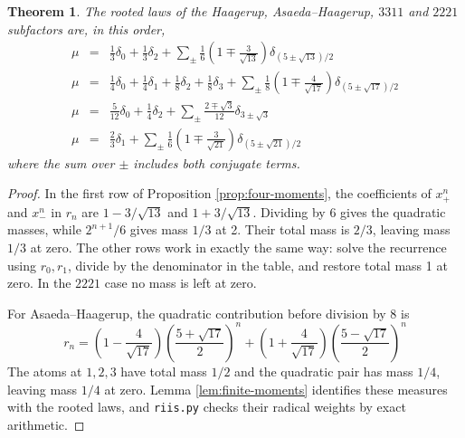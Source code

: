 \documentclass[11pt,reqno]{amsart}
\newtheorem{thm}{Theorem}[section]
\theoremstyle{definition}
\numberwithin{equation}{section}
\begin{document}
\begin{thm}\label{thm:four-laws}
The rooted laws of the Haagerup, Asaeda--Haagerup, $3311$ and $2221$ subfactors are, in this order,
\begin{eqnarray*}
\mu&=&\frac13\delta_0+\frac13\delta_2+\sum_\pm\frac16\left(1\mp\frac3{\sqrt{13}}\right)\delta_{(5\pm\sqrt{13})/2}\\
\mu&=&\frac14\delta_0+\frac14\delta_1+\frac18\delta_2+\frac18\delta_3+\sum_\pm\frac18\left(1\mp\frac4{\sqrt{17}}\right)\delta_{(5\pm\sqrt{17})/2}\\
\mu&=&\frac5{12}\delta_0+\frac14\delta_2+\sum_\pm\frac{2\mp\sqrt3}{12}\delta_{3\pm\sqrt3}\\
\mu&=&\frac23\delta_1+\sum_\pm\frac16\left(1\mp\frac3{\sqrt{21}}\right)\delta_{(5\pm\sqrt{21})/2}
\end{eqnarray*}
where the sum over $\pm$ includes both conjugate terms.
\end{thm}
\begin{proof}
In the first row of Proposition \ref{prop:four-moments}, the coefficients of $x_+^n$ and $x_-^n$ in $r_n$ are $1-3/\sqrt{13}$ and $1+3/\sqrt{13}$. Dividing by 6 gives the quadratic masses, while $2^{n+1}/6$ gives mass $1/3$ at 2. Their total mass is $2/3$, leaving mass $1/3$ at zero. The other rows work in exactly the same way: solve the recurrence using $r_0,r_1$, divide by the denominator in the table, and restore total mass 1 at zero. In the $2221$ case no mass is left at zero.

For Asaeda--Haagerup, the quadratic contribution before division by 8 is
$$r_n=\left(1-\frac4{\sqrt{17}}\right)\left(\frac{5+\sqrt{17}}2\right)^n+\left(1+\frac4{\sqrt{17}}\right)\left(\frac{5-\sqrt{17}}2\right)^n$$
The atoms at $1,2,3$ have total mass $1/2$ and the quadratic pair has mass $1/4$, leaving mass $1/4$ at zero. Lemma \ref{lem:finite-moments} identifies these measures with the rooted laws, and \texttt{riis.py} checks their radical weights by exact arithmetic.
\end{proof}
\end{document}
